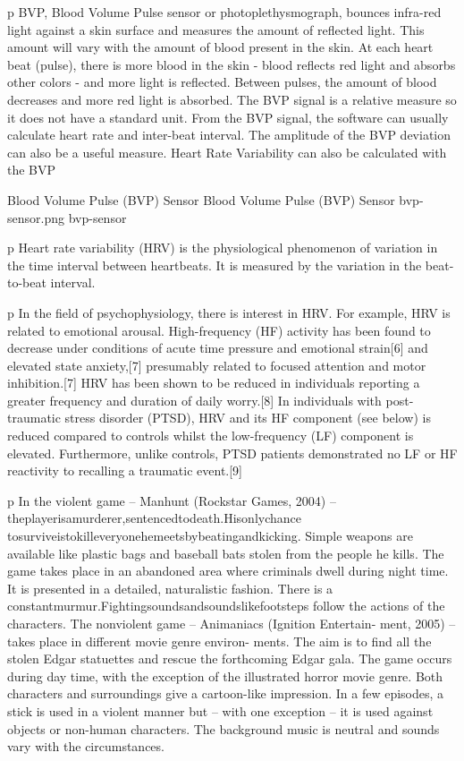 \documentclass{uofsthesis-cs}
\begin{document}
p BVP, Blood Volume Pulse sensor or photoplethysmograph, bounces infra-red light against a skin surface and measures the amount of reflected light. This amount will vary with the amount of blood present in the skin. At each heart beat (pulse), there is more blood in the skin - blood reflects red light and absorbs other colors - and more light is reflected. Between pulses, the amount of blood decreases and more red light is absorbed. The BVP signal is a relative measure so it does not have a standard unit. From the BVP signal, the software can usually calculate heart rate and inter-beat interval. The amplitude of the BVP deviation can also be a useful measure. Heart Rate Variability can also be calculated with the BVP

\img
{Blood Volume Pulse (BVP) Sensor}
{Blood Volume Pulse (BVP) Sensor}
{bvp-sensor.png}
{bvp-sensor}

p Heart rate variability (HRV) is the physiological phenomenon of variation in the time interval between heartbeats. It is measured by the variation in the beat-to-beat interval.

p In the field of psychophysiology, there is interest in HRV. For example, HRV is related to emotional arousal. High-frequency (HF) activity has been found to decrease under conditions of acute time pressure and emotional strain[6] and elevated state anxiety,[7] presumably related to focused attention and motor inhibition.[7] HRV has been shown to be reduced in individuals reporting a greater frequency and duration of daily worry.[8] In individuals with post-traumatic stress disorder (PTSD), HRV and its HF component (see below) is reduced compared to controls whilst the low-frequency (LF) component is elevated. Furthermore, unlike controls, PTSD patients demonstrated no LF or HF reactivity to recalling a traumatic event.[9]

p In the violent game – Manhunt (Rockstar Games, 2004) – theplayerisamurderer,sentencedtodeath.Hisonlychance tosurviveistokilleveryonehemeetsbybeatingandkicking. Simple weapons are available like plastic bags and baseball bats stolen from the people he kills. The game takes place in an abandoned area where criminals dwell during night time. It is presented in a detailed, naturalistic fashion. There is a constantmurmur.Fightingsoundsandsoundslikefootsteps follow the actions of the characters. The nonviolent game – Animaniacs (Ignition Entertain- ment, 2005) – takes place in different movie genre environ- ments. The aim is to find all the stolen Edgar statuettes and rescue the forthcoming Edgar gala. The game occurs during day time, with the exception of the illustrated horror movie genre. Both characters and surroundings give a cartoon-like impression. In a few episodes, a stick is used in a violent manner but – with one exception – it is used against objects or non-human characters. The background music is neutral and sounds vary with the circumstances.
\end{document}

